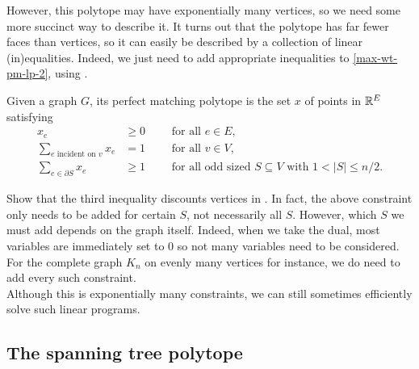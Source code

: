 	However, this polytope may have exponentially many vertices, so we need some more succinct way to describe it. It turns out that the polytope has far fewer faces than vertices, so it can easily be described by a collection of linear (in)equalities. Indeed, we just need to add appropriate inequalities to \eqref{max-wt-pm-lp-2}, using .
	
	\begin{ftheo}
		Given a graph $G$, its perfect matching polytope is the set $x$ of points in $\mathbb{R}^E$ satisfying
		\begin{align*}
			x_e &\ge 0 \qquad \text{ for all } e \in E, \\
			\sum_{e \text{ incident on }v} x_e &= 1 \qquad \text{ for all } v \in V, \\
			\sum_{e \in \partial S} x_e &\ge 1 \qquad \text{ for all odd sized $S \subseteq V$ with $1 < |S| \le n/2$}.
		\end{align*}
	\end{ftheo}
	Show that the third inequality discounts vertices in . In fact, the above constraint only needs to be added for certain $S$, not necessarily all $S$. However, which $S$ we must add depends on the graph itself. Indeed, when we take the dual, most variables are immediately set to $0$ so not many variables need to be considered. For the complete graph $K_{n}$ on evenly many vertices for instance, we do need to add every such constraint.\\
	Although this is exponentially many constraints, we can still sometimes efficiently solve such linear programs.

\subsection{The spanning tree polytope}


